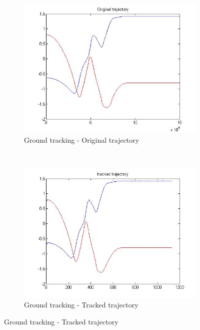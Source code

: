 \begin{figure}[htp]
	\centering
	\begin{subfigure}[htp]{0.48\linewidth}
		\centering
		\includegraphics[width=\linewidth]{../Images/c3/sim2_traj_ori}
		\caption{Ground tracking - Original trajectory}
		\label{fig:sim2_traj_ori}
	\end{subfigure}
	~
	\begin{subfigure}[htp]{0.48\linewidth}
		\centering
		\includegraphics[width=\linewidth]{../Images/c3/sim2_traj_track}
		\caption{Ground tracking - Tracked trajectory}
		\label{fig:sim2_traj_track}
	\end{subfigure}

\end{figure}


